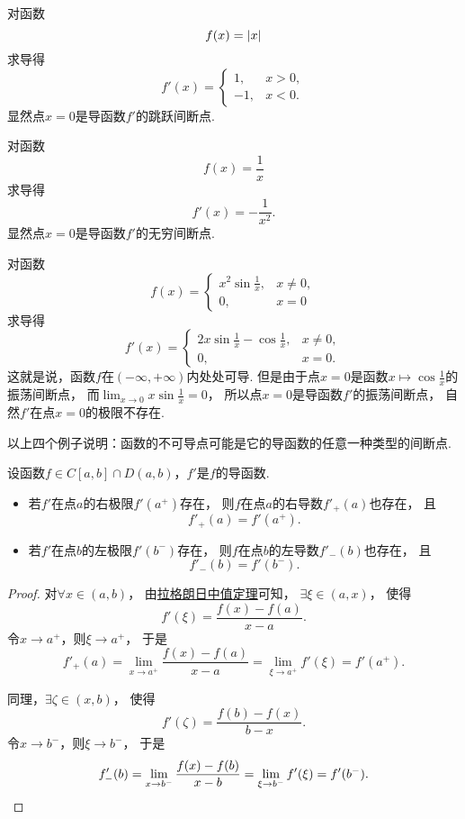 \begin{example}
对函数\[
	f(x) = \abs{x}
\]求导得\[
	f'(x) = \left\{ \begin{array}{cl}
		1, & x>0, \\
		-1, & x<0.
	\end{array} \right.
\]
显然点\(x=0\)是导函数\(f'\)的跳跃间断点.
\end{example}

\begin{example}
对函数\[
	f(x) = \frac1x
\]求导得\[
	f'(x) = -\frac1{x^2}.
\]
显然点\(x=0\)是导函数\(f'\)的无穷间断点.
\end{example}

\begin{example}
对函数\[
	f(x) = \left\{ \begin{array}{cl}
		x^2 \sin\frac1x, & x \neq 0, \\
		0, & x = 0
	\end{array} \right.
\]求导得\[
	f'(x) = \left\{ \begin{array}{cl}
		2x \sin\frac1x - \cos\frac1x, & x \neq 0, \\
		0, & x = 0.
	\end{array} \right.
\]
这就是说，函数\(f\)在\((-\infty,+\infty)\)内处处可导.
但是由于点\(x=0\)是函数\(x \mapsto \cos\frac1x\)的振荡间断点，
而\(\lim_{x\to0} x \sin\frac1x = 0\)，
所以点\(x=0\)是导函数\(f'\)的振荡间断点，
自然\(f'\)在点\(x=0\)的极限不存在.
\end{example}

以上四个例子说明：函数的不可导点可能是它的导函数的任意一种类型的间断点.

\begin{theorem}[导数极限定理]\label{theorem:微分中值定理.导数极限定理}
设函数\(f \in C[a,b] \cap D(a,b)\)，\(f'\)是\(f\)的导函数.
\begin{itemize}
	\item 若\(f'\)在点\(a\)的右极限\(f'(a^+)\)存在，
	则\(f\)在点\(a\)的右导数\(f'_+(a)\)也存在，
	且\[
		f'_+(a) = f'(a^+).
	\]
	\item 若\(f'\)在点\(b\)的左极限\(f'(b^-)\)存在，
	则\(f\)在点\(b\)的左导数\(f'_-(b)\)也存在，
	且\[
		f'_-(b) = f'(b^-).
	\]
\end{itemize}
\begin{proof}
对\(\forall x\in(a,b)\)，
由\hyperref[theorem:微分中值定理.拉格朗日中值定理]{拉格朗日中值定理}可知，
\(\exists\xi\in(a,x)\)，
使得\[
	f'(\xi) = \frac{f(x)-f(a)}{x-a}.
\]
令\(x \to a^+\)，则\(\xi \to a^+\)，
于是\[
	f'_+(a)
	= \lim_{x \to a^+} \frac{f(x)-f(a)}{x-a}
	= \lim_{\xi \to a^+} f'(\xi)
	= f'(a^+).
\]

同理，\(\exists\zeta\in(x,b)\)，
使得\[
	f'(\zeta) = \frac{f(b)-f(x)}{b-x}.
\]
令\(x \to b^-\)，则\(\xi \to b^-\)，
于是\[
	f'_-(b)
	= \lim_{x \to b^-} \frac{f(x)-f(b)}{x-b}
	= \lim_{\xi \to b^-} f'(\xi)
	= f'(b^-).
	\qedhere
\]
\end{proof}
\end{theorem}

